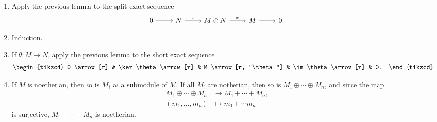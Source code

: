 \leavevmode
\begin{enumerate}[label=(\roman*)]
	\item Apply the previous lemma to the split exact sequence
		\[\begin{tikzcd}
			0 \arrow[r] & N \arrow[r, "\iota"] & M\oplus N \arrow[r, "\pi"] & M \arrow[r] & 0.
		\end{tikzcd}\]
	\item Induction.
	\item If $\theta\colon M\to N$, apply the previous lemma to the short exact sequence
		\[\begin{tikzcd}
			0 \arrow[r] & \ker \theta \arrow[r] & M \arrow[r, "\theta"] & \im\theta \arrow[r] & 0.
		\end{tikzcd}\]
	\item If $M$ is noetherian, then so is $M_i$ as a submodule of $M$. If all $M_i$
		are notherian, then so is $M_1 \oplus \cdots \oplus M_n$, and since the map
		\begin{align*}
			M_1\oplus \cdots \oplus M_n&\to M_1 + \cdots + M_n,\\
			(m_1, \ldots, m_n)&\mapsto m_1+\cdots m_n
		\end{align*}
		is surjective, $M_1 + \cdots + M_n$ is noetherian.\qedhere
\end{enumerate}
